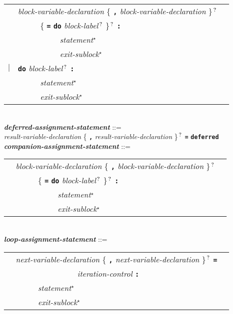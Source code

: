 \documentclass[12pt]{article}
\newcommand{\TT}[1]{{\tt \bfseries #1}}
\newcommand{\STAR}{{\Large $^\star$}}
\newcommand{\QMARK}{{$^{\,\mbox{\footnotesize ?}}$}}
\newcommand{\ttkey}[1]{{\tt \bfseries #1}}
\newcommand{\emkey}[1]{{\em \bfseries #1}}
\newenvironment{indpar}[1][0.3in]%
	{\begin{list}{}%
		     {\setlength{\itemsep}{0in}%
		      \setlength{\topsep}{0in}%
		      \setlength{\parsep}{1ex}%
		      \setlength{\labelwidth}{#1}%
		      \setlength{\leftmargin}{#1}%
		      \addtolength{\leftmargin}{\labelsep}}%
	 \item}%
	{\end{list}}
\begin{document}
\begin{indpar}
\hspace*{0.5in}
    \begin{tabular}[t]{@{}rll}
        & {\em block-variable-declaration}
                \{ \TT{,} {\em block-variable-declaration} \}\QMARK{} \\
	& ~~~~~ \{ \TT{=}
		   \ttkey{do} {\em block-label}\QMARK{} \}\QMARK{} \TT{:} \\
        & ~~~~~~~~~~ {\em statement}\STAR{} \\
        & ~~~~~~~~~~ {\em exit-sublock}\STAR{} \\
    $|$ & \ttkey{do} {\em block-label}\QMARK{} \TT{:} \\
        & ~~~~~ {\em statement}\STAR{} \\
        & ~~~~~ {\em exit-sublock}\STAR{} \\
    \end{tabular}
\\[0.5ex]
\emkey{deferred-assignment-statement} ::= \\
\hspace*{0.5in}
        {\em result-variable-declaration}
	    \{ \TT{,} {\em result-variable-declaration} \}\QMARK{}
	    \TT{=} \ttkey{deferred}
\\[0.5ex]
\emkey{companion-assignment-statement} ::= \\
\hspace*{0.5in}
    \begin{tabular}[t]{@{}rll}
        & {\em block-variable-declaration}
                \{ \TT{,} {\em block-variable-declaration} \}\QMARK{} \\
	& ~~~~~ \{ \TT{=}
		   \ttkey{do} {\em block-label}\QMARK{} \}\QMARK{} \TT{:} \\
        & ~~~~~~~~~~ {\em statement}\STAR{} \\
        & ~~~~~~~~~~ {\em exit-sublock}\STAR{} \\
    \end{tabular}
\\[0.5ex]
\emkey{loop-assignment-statement} ::= \\
\hspace*{0.5in}
    \begin{tabular}[t]{@{}rll}
        & {\em next-variable-declaration}
                \{ \TT{,} {\em next-variable-declaration} \}\QMARK{}
		\TT{=} \\
	& ~~~~~~~~~~~~~~~ {\em iteration-control} \TT{:} \\
        & ~~~~~ {\em statement}\STAR{} \\
        & ~~~~~ {\em exit-sublock}\STAR{} \\

\end{tabular}
\end{indpar}
\end{document}
